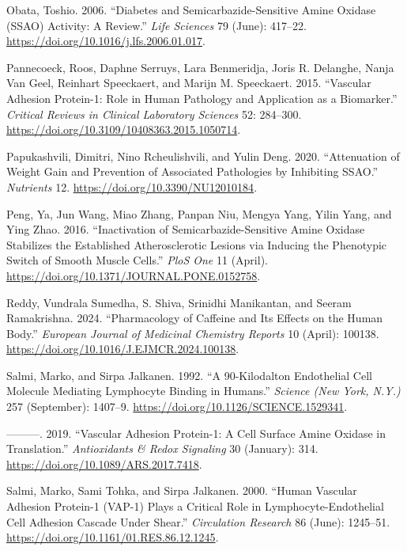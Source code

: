 \documentclass[
  letterpaper,
  DIV=11,
  numbers=noendperiod]{scrreprt}
\newlength{\cslhangindent}
\newenvironment{CSLReferences}[2] %
 {\begin{list}{}{%
  \setlength{\itemindent}{0pt}
  \setlength{\leftmargin}{0pt}
  \setlength{\parsep}{0pt}
  \ifodd #1
   \setlength{\leftmargin}{\cslhangindent}
   \setlength{\itemindent}{-1\cslhangindent}
  \fi
  \setlength{\itemsep}{#2\baselineskip}}}
 {\end{list}}
\begin{document}
\begin{CSLReferences}{1}{0}
Obata, Toshio. 2006. {``Diabetes and Semicarbazide-Sensitive Amine
Oxidase (SSAO) Activity: A Review.''} \emph{Life Sciences} 79 (June):
417--22. \url{https://doi.org/10.1016/j.lfs.2006.01.017}.

Pannecoeck, Roos, Daphne Serruys, Lara Benmeridja, Joris R. Delanghe,
Nanja Van Geel, Reinhart Speeckaert, and Marijn M. Speeckaert. 2015.
{``Vascular Adhesion Protein-1: Role in Human Pathology and Application
as a Biomarker.''} \emph{Critical Reviews in Clinical Laboratory
Sciences} 52: 284--300.
\url{https://doi.org/10.3109/10408363.2015.1050714}.

Papukashvili, Dimitri, Nino Rcheulishvili, and Yulin Deng. 2020.
{``Attenuation of Weight Gain and Prevention of Associated Pathologies
by Inhibiting SSAO.''} \emph{Nutrients} 12.
\url{https://doi.org/10.3390/NU12010184}.

Peng, Ya, Jun Wang, Miao Zhang, Panpan Niu, Mengya Yang, Yilin Yang, and
Ying Zhao. 2016. {``Inactivation of Semicarbazide-Sensitive Amine
Oxidase Stabilizes the Established Atherosclerotic Lesions via Inducing
the Phenotypic Switch of Smooth Muscle Cells.''} \emph{PloS One} 11
(April). \url{https://doi.org/10.1371/JOURNAL.PONE.0152758}.

Reddy, Vundrala Sumedha, S. Shiva, Srinidhi Manikantan, and Seeram
Ramakrishna. 2024. {``Pharmacology of Caffeine and Its Effects on the
Human Body.''} \emph{European Journal of Medicinal Chemistry Reports} 10
(April): 100138. \url{https://doi.org/10.1016/J.EJMCR.2024.100138}.

Salmi, Marko, and Sirpa Jalkanen. 1992. {``A 90-Kilodalton Endothelial
Cell Molecule Mediating Lymphocyte Binding in Humans.''} \emph{Science
(New York, N.Y.)} 257 (September): 1407--9.
\url{https://doi.org/10.1126/SCIENCE.1529341}.

---------. 2019. {``Vascular Adhesion Protein-1: A Cell Surface Amine
Oxidase in Translation.''} \emph{Antioxidants \& Redox Signaling} 30
(January): 314. \url{https://doi.org/10.1089/ARS.2017.7418}.

Salmi, Marko, Sami Tohka, and Sirpa Jalkanen. 2000. {``Human Vascular
Adhesion Protein-1 (VAP-1) Plays a Critical Role in
Lymphocyte-Endothelial Cell Adhesion Cascade Under Shear.''}
\emph{Circulation Research} 86 (June): 1245--51.
\url{https://doi.org/10.1161/01.RES.86.12.1245}.


\end{CSLReferences}
\end{document}
